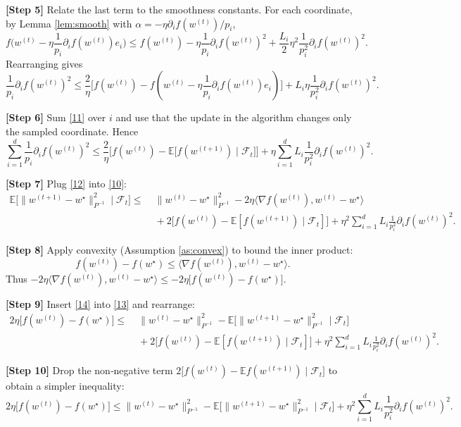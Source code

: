 \documentclass{article}
\newcommand{\E}{\mathbb{E}}
\newcommand{\ip}[2]{\langle #1,#2\rangle}
\begin{document}
\noindent\textbf{[Step 5]}  Relate the last term to the smoothness constants.
For each coordinate, by Lemma \ref{lem:smooth} with $\alpha=-\eta\partial_i f(w^{(t)})/p_i$,
\[
f\!\bigl(w^{(t)}-\eta\frac{1}{p_i}\partial_i f(w^{(t)})e_i\bigr)
\le f(w^{(t)})-\eta\frac{1}{p_i}\partial_i f(w^{(t)})^{2}
   +\frac{L_i}{2}\eta^{2}\frac{1}{p_i^{2}}\partial_i f(w^{(t)})^{2}.
\]
Rearranging gives
\[
\frac{1}{p_i}\partial_i f(w^{(t)})^{2}
\le \frac{2}{\eta}\bigl[f(w^{(t)})-f(w^{(t)}-\eta\frac{1}{p_i}\partial_i f(w^{(t)})e_i)\bigr]
   +L_i\eta\frac{1}{p_i^{2}}\partial_i f(w^{(t)})^{2}.
\tag{11}
\]

\noindent\textbf{[Step 6]}  Sum \eqref{11} over $i$ and use that the update in the
algorithm changes only the sampled coordinate. Hence
\[
\sum_{i=1}^{d}\frac{1}{p_i}\partial_i f(w^{(t)})^{2}
\le \frac{2}{\eta}\bigl[f(w^{(t)})- \E\bigl[f(w^{(t+1)})\mid\mathcal{F}_t\bigr]\bigr]
   +\eta\sum_{i=1}^{d}L_i\frac{1}{p_i^{2}}\partial_i f(w^{(t)})^{2}.
\tag{12}
\]

\noindent\textbf{[Step 7]}  Plug \eqref{12} into \eqref{10}:
\[
\begin{aligned}
\E\!\bigl[\|w^{(t+1)}-w^{\star}\|_{P^{-1}}^{2}\mid\mathcal{F}_t\bigr]
\le &\; \|w^{(t)}-w^{\star}\|_{P^{-1}}^{2}
      -2\eta\ip{\nabla f(w^{(t)})}{w^{(t)}-w^{\star}} \\
    &\; +2\bigl[f(w^{(t)})-\E[f(w^{(t+1)})\mid\mathcal{F}_t]\bigr]
      +\eta^{2}\sum_{i=1}^{d}L_i\frac{1}{p_i^{2}}\partial_i f(w^{(t)})^{2}.
\end{aligned}
\tag{13}
\]

\noindent\textbf{[Step 8]}  Apply convexity (Assumption \ref{as:convex}) to bound
the inner product:
\[
f(w^{(t)})-f(w^{\star})\le \ip{\nabla f(w^{(t)})}{w^{(t)}-w^{\star}}.
\tag{14}
\]
Thus $-2\eta\ip{\nabla f(w^{(t)})}{w^{(t)}-w^{\star}}
\le -2\eta\bigl[f(w^{(t)})-f(w^{\star})\bigr]$.

\noindent\textbf{[Step 9]}  Insert \eqref{14} into \eqref{13} and rearrange:
\[
\begin{aligned}
2\eta\bigl[f(w^{(t)})-f(w^{\star})\bigr]
\le &\; \|w^{(t)}-w^{\star}\|_{P^{-1}}^{2}
      -\E\!\bigl[\|w^{(t+1)}-w^{\star}\|_{P^{-1}}^{2}\mid\mathcal{F}_t\bigr] \\
    &\; +2\bigl[f(w^{(t)})-\E[f(w^{(t+1)})\mid\mathcal{F}_t]\bigr]
      +\eta^{2}\sum_{i=1}^{d}L_i\frac{1}{p_i^{2}}\partial_i f(w^{(t)})^{2}.
\end{aligned}
\tag{15}
\]

\noindent\textbf{[Step 10]}  Drop the non‑negative term $2\bigl[f(w^{(t)})-\E f(w^{(t+1)})\mid\mathcal{F}_t\bigr]$
to obtain a simpler inequality:
\[
2\eta\bigl[f(w^{(t)})-f(w^{\star})\bigr]
\le \|w^{(t)}-w^{\star}\|_{P^{-1}}^{2}
    -\E\!\bigl[\|w^{(t+1)}-w^{\star}\|_{P^{-1}}^{2}\mid\mathcal{F}_t\bigr]
    +\eta^{2}\sum_{i=1}^{d}L_i\frac{1}{p_i^{2}}\partial_i f(w^{(t)})^{2}.
\tag{16}
\]
\end{document}
